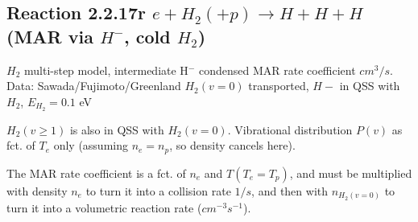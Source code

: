 \documentclass[12pt,dvipdfmx]{article}
\begin{document}
\subsection{
Reaction 2.2.17r   $e + H_2 (+p)   \rightarrow H + H + H  $ (MAR via $H^-$, cold $H_2$)
}

$H_2$ multi-step model, intermediate H$^-$ condensed MAR rate coefficient $cm^3/s$.
Data: Sawada/Fujimoto/Greenland \cite{kn:Sawada}
$H_2(v=0)$ transported, $H-$ in QSS with $H_2$, $E_{H_2}=0.1$ eV

$H_2(v\geq 1)$ is also in QSS with $H_2(v=0)$. Vibrational distribution $P(v)$ as fct. of $T_e$ only (assuming $n_e=n_p$, so density cancels here).

The MAR rate coefficient is a fct. of $n_e$ and $T (T_e=T_p)$, and must be multiplied with density $n_e$ to turn it into a collision rate $1/s$,
and then with $n_{H_2(v=0)}$ to turn it into a volumetric reaction rate ($cm^{-3}s^{-1}$).
\end{document}
